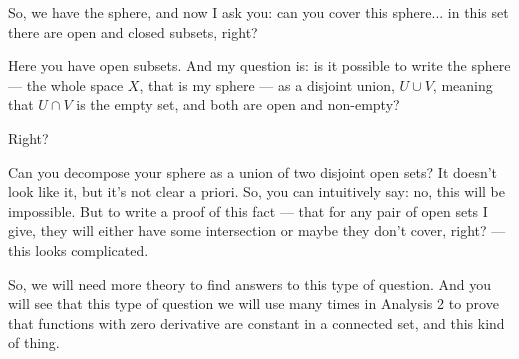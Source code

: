 \begin{speech}[01:17:54 - 01:19:58]
So, we have the sphere, and now I ask you: can you cover this sphere... in this set there are open and closed subsets, right? 

Here you have open subsets. And my question is: is it possible to write  the sphere --- the whole space $X$, that is my sphere  --- as a disjoint union, $U \cup V$,  meaning that $U \cap V$ is the empty set,   and both are open and non-empty? 

Right?

Can you decompose your sphere as a union of two disjoint open sets? It doesn't look like it, but it's not clear a priori. So, you can intuitively say: no, this will be impossible. But to write a proof of this fact --- that for any pair of open sets I give, they will either have some intersection or maybe they don't cover, right? --- this looks complicated.

So, we will need more theory to find answers to this type of question. And you will see that this type of question we will use many times in Analysis 2 to prove that functions with zero derivative are constant in a connected set, and this kind of thing.
\end{speech}

